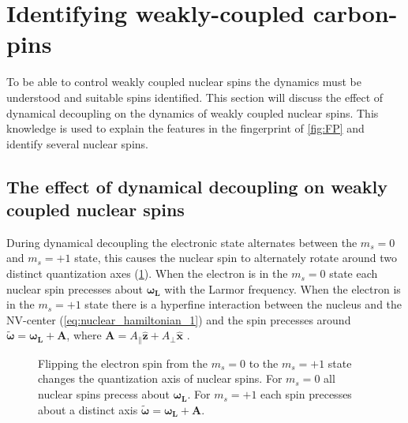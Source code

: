 \section{Identifying weakly-coupled carbon-pins}
To be able to control weakly coupled nuclear spins the dynamics must be understood and suitable spins identified.
This section will discuss the effect of dynamical decoupling on the dynamics of weakly coupled nuclear spins.
This knowledge is used to explain the features in the fingerprint of \cref{fig:FP} and identify several nuclear spins.

\subsection{The effect of dynamical decoupling on weakly coupled nuclear spins}

During dynamical decoupling the electronic state alternates between the $m_s = 0$ and $m_s =+1$ state, this causes the nuclear spin to alternately rotate around two distinct quantization axes (\cref{fig:quantax}).
When the electron is in the $m_s=0$ state each nuclear spin precesses about $\bm{\omega_L}$ with the Larmor frequency.
When the electron is in the $m_s=+1$ state there is a hyperfine interaction between the nucleus and the NV-center (\cref{eq:nuclear_hamiltonian_1}) and the spin precesses around $\bm{\tilde{\omega}}=\bm{\omega_L} +\bm{A}$, where $\bm{A} = A_\parallel \bm{\hat{z}} + A_\perp \bm{\hat{x}}$ \citep{Taminiau2012Detection}.


\begin{figure}[htbp]
\centering

\caption{Flipping the electron spin from the  $m_s=0$ to the $m_s= +1$ state changes the quantization axis of nuclear spins. For  $m_s=0$ all nuclear spins precess about $\bm{\omega_L}$. For  $m_s=+1$ each spin precesses about a distinct axis $\bm{\tilde{\omega}}=\bm{\omega_L} +\bm{A}$.}
\label{fig:quantax}
\end{figure}


